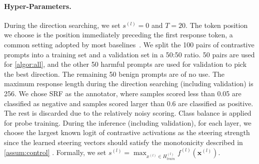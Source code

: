 \documentclass{article}
\theoremstyle{plain}
\theoremstyle{definition}
\theoremstyle{remark}
\begin{document}
\paragraph{Hyper-Parameters.} During the direction searching, we set $s^{(l)} = 0$ and $T = 20$. The token position we choose is the position immediately preceding the first response token, a common setting adopted by most baselines~\cite{rep, scav, angle}. We split the 100 pairs of contrastive prompts into a training set and a validation set in a 50:50 ratio. 50 pairs are used for \cref{algor:all}, and the other 50 harmful prompts are used for validation to pick the best direction. The remaining 50 benign prompts are of no use. The maximum response length during the direction searching (including validation) is 256. We chose SRF as the annotator, where samples scored less than 0.05 are classified as negative and samples scored larger than 0.6 are classified as positive. The rest is discarded due to the relatively noisy scoring. Class balance is applied for probe training. During the inference (including validation), for each layer, we choose the largest known logit of contrastive activations as the steering strength since the learned steering vectors should satisfy the monotonicity described in \cref{assum:control} . Formally, we set $s^{(l)} = \max_{x^{(l)} \in H_{train}^{(l)}} f^{(l)}(\mathbf{x}^{(l)})$.
\end{document}
